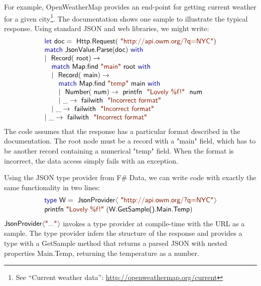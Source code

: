 \documentclass[10pt,preprint,blind,clearpagebib]{sigplanconf}
\newcommand{\langl}{\begin{picture}(4.5,7)
\put(1.1,2.5){\rotatebox{60}{\line(1,0){5.5}}}
\put(1.1,2.5){\rotatebox{300}{\line(1,0){5.5}}}
\end{picture}}
\newcommand{\rangl}{\begin{picture}(4.5,7)
\put(.9,2.5){\rotatebox{120}{\line(1,0){5.5}}}
\put(.9,2.5){\rotatebox{240}{\line(1,0){5.5}}}
\end{picture}}
\newcommand{\kvd}[1]{\textnormal{\textcolor{kvdclr}{\sffamily #1}}}
\newcommand{\str}[1]{\textnormal{\textcolor{strclr}{\sffamily "#1"}}}
\newcommand{\ident}[1]{\textnormal{\sffamily #1}}
\begin{document}
For example, OpenWeatherMap provides an end-point for getting current weather for a 
given city\footnote{See ``Current weather data'': \url{http://openweathermap.org/current}}. 
The documentation shows one sample to illustrate the typical response. Using standard 
JSON and web libraries, we might write:
%
\begin{equation*}
\begin{array}{l}
 \kvd{let}~\ident{doc}=\ident{Http.Request}(\str{http://api.owm.org/?q=NYC}) \\
 \kvd{match}~\ident{JsonValue.Parse}(\ident{doc})~\kvd{with} \\
 |~\ident{Record}(\ident{root})\rightarrow \\
 \quad \kvd{match}~\ident{Map.find}~\str{main}~\ident{root}~\kvd{with} \\
 \quad |~\ident{Record}(\ident{main})\rightarrow \\
 \quad \quad \kvd{match}~\ident{Map.find}~\str{temp}~\ident{main}~\kvd{with} \\
 \quad \quad |~\ident{Number}(\ident{num})\rightarrow \ident{printfn}~\str{Lovely \%f!}~\ident{num} \\
 \quad \quad |~\_\rightarrow \ident{failwith}~\str{Incorrect format} \\
 \quad |~\_\rightarrow \ident{failwith}~\str{Incorrect format} \\
 |~\_\rightarrow \ident{failwith}~\str{Incorrect format} 
\end{array}
\end{equation*}
%
The code assumes that the response has a particular format described in the documentation. The
root node must be a record with a \str{main} field, which has to be another record containing
a numerical \str{temp} field. When the format is incorrect, the data access simply fails
with an exception.

Using the JSON type provider from F\# Data, we can write code with exactly the 
same functionality in two lines:
%
\begin{equation*}
\begin{array}{l}
 \kvd{type}~\ident{W} = \ident{JsonProvider}\langl\str{http://api.owm.org/?q=NYC}\rangl \\[0.1em]
 \ident{printfn}~\str{Lovely \%f!}~(\ident{W.GetSample().Main.Temp})
\end{array}
\end{equation*}
%
$\ident{JsonProvider}\langl\str{...}\rangl$ invokes a type provider at 
compile-time with the URL as a sample. The type provider infers the structure of the response
and provides a type with a \ident{GetSample} method that returns a parsed JSON with nested
properties \ident{Main.Temp}, returning the temperature as a number.
\end{document}
